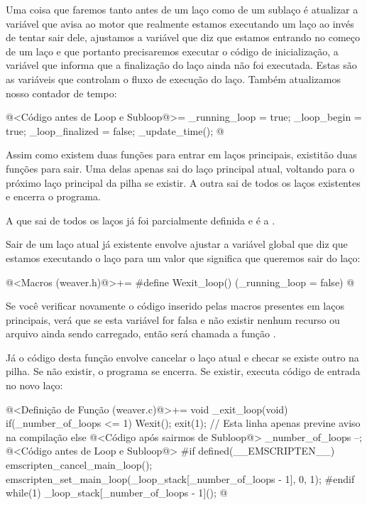 Uma coisa que faremos tanto antes de um laço como de um sublaço é
atualizar a variável  que avisa ao motor
que realmente estamos executando um laço ao invés de tentar sair dele,
ajustamos a variável que diz que estamos entrando no começo de um laço
e que portanto precisaremos executar o código de inicialização, a
variável que informa que a finalização do laço ainda não foi
executada. Estas são as variáveis que controlam o fluxo de execução do
laço. Também atualizamos nosso contador de tempo:

\iniciocodigo
@<Código antes de Loop e Subloop@>=
_running_loop = true;
_loop_begin = true;
_loop_finalized = false;
_update_time();
@
\fimcodigo


Assim como existem duas funções para entrar em laços principais,
existitão duas funções para sair. Uma delas apenas sai do laço
principal atual, voltando para o próximo laço principal da pilha se
existir. A outra sai de todos os laços existentes e encerra o
programa.

A que sai de todos os laços já foi parcialmente definida e é
a .

Sair de um laço atual já existente envolve ajustar a variável global
que diz que estamos executando o laço para um valor que significa que
queremos sair do laço:

\iniciocodigo
@<Macros (weaver.h)@>+=
#define Wexit_loop() (_running_loop = false)
@
\fimcodigo

Se você verificar novamente o código inserido pelas macros presentes
em laços principais, verá que se esta variável for falsa e não existir
nenhum recurso ou arquivo ainda sendo carregado, então será chamada a
função .

Já o código desta função envolve cancelar o laço atual e checar se
existe outro na pilha. Se não existir, o programa se encerra. Se
existir, executa código de entrada no novo laço:

\iniciocodigo
@<Definição de Função (weaver.c)@>+=
void _exit_loop(void){
  if(_number_of_loops <= 1){
    Wexit();
    exit(1); // Esta linha apenas previne aviso na compilação
  }
  else{
    @<Código após sairmos de Subloop@>
    _number_of_loops --;
    @<Código antes de Loop e Subloop@>
#if defined(__EMSCRIPTEN__)
    emscripten_cancel_main_loop();
    emscripten_set_main_loop(_loop_stack[_number_of_loops - 1], 0, 1);
#endif
    while(1)
      _loop_stack[_number_of_loops - 1]();
  }
}
@
\fimcodigo

